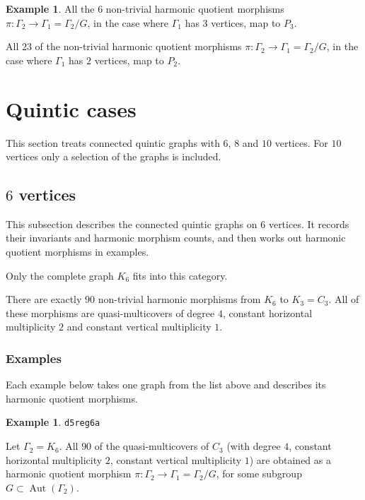 \documentclass[12pt,letterpaper]{article}
\theoremstyle{definition}
\newtheorem{example}[theorem]{Example}
\DeclareMathOperator{\Aut}{Aut}
\begin{document}
\begin{example}
{All the $6$ non-trivial harmonic quotient morphisms
$\pi: \Gamma_2\to \Gamma_1=\Gamma_2/G$, in the case where
$\Gamma_1$ has $3$ vertices, map to $P_3$.

All $23$ of the non-trivial harmonic quotient morphisms
$\pi: \Gamma_2\to \Gamma_1=\Gamma_2/G$, in the case where
$\Gamma_1$ has $2$ vertices, map to $P_2$.
}
\end{example}


  
\section{Quintic cases}
\label{sec:quintic-examples}

This section treats connected quintic graphs with $6$, $8$ and $10$
vertices. For $10$ vertices only a selection of the graphs is included.


\subsection{\texorpdfstring{$6$}{6} vertices}

This subsection describes the connected quintic graphs on $6$ vertices.
It records their invariants and harmonic morphism counts, and then
works out harmonic quotient morphisms in examples.


Only the complete graph $K_6$ fits into this category.

There are exactly $90$ non-trivial harmonic morphisms from
$K_6$ to $K_3=C_3$. All of these morphisms are quasi-multicovers
of degree $4$, constant horizontal multiplicity $2$ and
constant vertical multiplicity $1$.


\subsubsection{Examples}

Each example below takes one graph from the list above and describes
its harmonic quotient morphisms.


\begin{example}%
\label{example:d5reg6a}
  {\tt d5reg6a}\newline
{\rm  
  Let $\Gamma_2=K_6$. All $90$ of the quasi-multicovers
of $C_3$ (with degree $4$, constant horizontal multiplicity $2$,
constant vertical multiplicity $1$) are obtained as a harmonic
quotient morphism $\pi:\Gamma_2 \to \Gamma_1=\Gamma_2/G$, for some
subgroup $G\subset \Aut(\Gamma_2)$.

}
\end{example}
\end{document}
